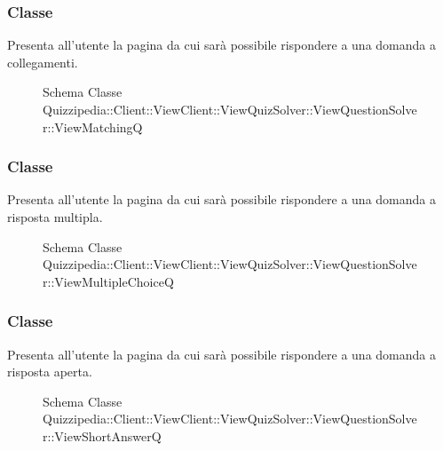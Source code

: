 \subsubsection{Classe }
Presenta all'utente la pagina da cui sarà possibile rispondere a una domanda a collegamenti.
\begin{figure}[H]
\centering
\noindent{}
\caption[Schema Classe ViewMatchingQ]{Schema Classe Quizzipedia::Client::ViewClient::ViewQuizSolver::ViewQuestionSolver::ViewMatchingQ}
\end{figure}
\subsubsection{Classe }
Presenta all'utente la pagina da cui sarà possibile rispondere a una domanda a risposta multipla.
\begin{figure}[H]
\centering
\noindent{}
\caption[Schema Classe ViewMultipleChoiceQ]{Schema Classe Quizzipedia::Client::ViewClient::ViewQuizSolver::ViewQuestionSolver::ViewMultipleChoiceQ}
\end{figure}
\subsubsection{Classe }
Presenta all'utente la pagina da cui sarà possibile rispondere a una domanda a risposta aperta.
\begin{figure}[H]
\centering
\noindent{}
\caption[Schema Classe ViewShortAnswerQ]{Schema Classe Quizzipedia::Client::ViewClient::ViewQuizSolver::ViewQuestionSolver::ViewShortAnswerQ}
\end{figure}
